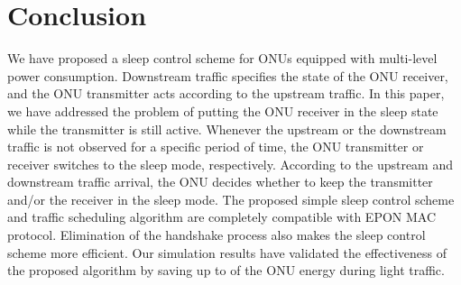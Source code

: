 \documentclass[11pt,english,12pt,onecolumn, draftcls]{IEEEtran}
\theoremstyle{plain}
\theoremstyle{definition}
\begin{document}
\section{Conclusion}
\label{sec:Con}
We have proposed a sleep control scheme for ONUs equipped with multi-level power consumption.  Downstream traffic specifies the state of the ONU receiver, and the ONU transmitter acts according to the upstream traffic. In this paper, we have addressed the problem of putting the ONU receiver in the sleep state while the transmitter is still active. Whenever the upstream or the downstream traffic is not observed for a specific period of time, the ONU transmitter or receiver switches to the sleep mode, respectively. According to the upstream and downstream traffic arrival, the ONU decides whether to keep the transmitter and/or the receiver in the sleep mode. The proposed simple sleep control scheme and traffic scheduling algorithm are completely compatible with EPON MAC protocol. Elimination of the handshake process also makes the sleep control scheme more efficient. Our simulation results have validated the effectiveness of the proposed algorithm by saving up to  of the ONU energy during light traffic.



\end{document}
